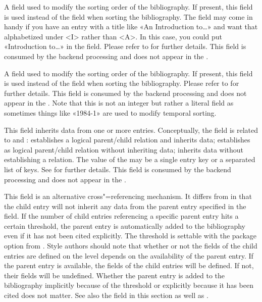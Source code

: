 \documentclass{ltxdockit}[2011/03/25]
\newcommand*{\biblatex}{\sty{biblatex}\xspace}
\begin{document}
\begin{fieldlist}

A field used to modify the sorting order of the bibliography. If present, this field is used instead of the  field when sorting the bibliography. The  field may come in handy if you have an entry with a title like «An Introduction to\dots» and want that alphabetized under <I> rather than <A>. In this case, you could put «Introduction to\dots» in the  field. Please refer to  for further details. This field is consumed by the backend processing and does not appear in the .


A field used to modify the sorting order of the bibliography. If present, this field is used instead of the  field when sorting the bibliography. Please refer to  for further details. This field is consumed by the backend processing and does not appear in the . Note that this is not an integer but rather a literal field as sometimes things like «1984-1» are used to modify temporal sorting.


This field inherits data from one or more  entries. Conceptually, the  field is related to  and :  establishes a logical parent/child relation and inherits data;  establishes as logical parent/child relation without inheriting data;  inherits data without establishing a relation. The value of the  may be a single entry key or a separated list of keys. See  for further details. This field is consumed by the backend processing and does not appear in the .


This field is an alternative cross"=referencing mechanism. It differs from  in that the child entry will not inherit any data from the parent entry specified in the  field. If the number of child entries referencing a specific parent entry hits a certain threshold, the parent entry is automatically added to the bibliography even if it has not been cited explicitly. The threshold is settable with the  package option from . Style authors should note that whether or not the  fields of the child entries are defined on the \biblatex level depends on the availability of the parent entry. If the parent entry is available, the  fields of the child entries will be defined. If not, their  fields will be undefined. Whether the parent entry is added to the bibliography implicitly because of the threshold or explicitly because it has been cited does not matter. See also the  field in this section as well as .

\end{fieldlist}
\end{document}
